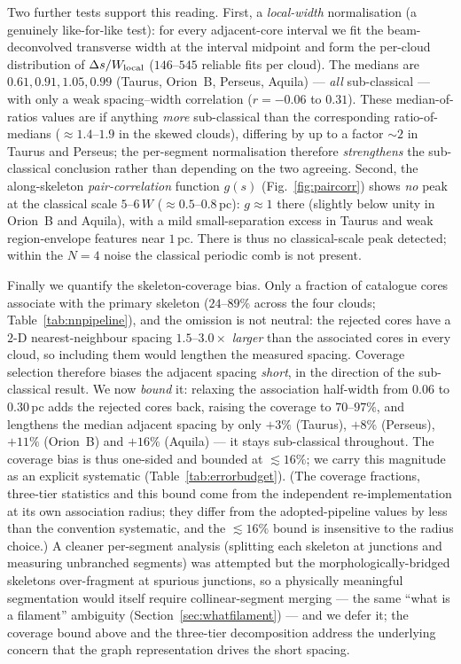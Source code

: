\documentclass[usenatbib,twoside,twocolumn]{mnras}
\begin{document}
Two further tests support this reading. First, a \emph{local-width} normalisation (a genuinely like-for-like test): for every adjacent-core interval we fit the beam-deconvolved transverse width at the interval midpoint and form the per-cloud distribution of $\Delta s/W_{\rm local}$ ($146$--$545$ reliable fits per cloud). The medians are $0.61,0.91,1.05,0.99$ (Taurus, Orion~B, Perseus, Aquila) --- \emph{all} sub-classical --- with only a weak spacing--width correlation ($r=-0.06$ to $0.31$). These median-of-ratios values are if anything \emph{more} sub-classical than the corresponding ratio-of-medians ($\approx1.4$--$1.9$ in the skewed clouds), differing by up to a factor $\sim2$ in Taurus and Perseus; the per-segment normalisation therefore \emph{strengthens} the sub-classical conclusion rather than depending on the two agreeing. Second, the along-skeleton \emph{pair-correlation} function $g(s)$ (Fig.~\ref{fig:paircorr}) shows \emph{no} peak at the classical scale $5$--$6\,W$ ($\approx0.5$--$0.8$\,pc): $g\approx1$ there (slightly below unity in Orion~B and Aquila), with a mild small-separation excess in Taurus and weak region-envelope features near $1$\,pc. There is thus no classical-scale peak detected; within the $N=4$ noise the classical periodic comb is not present.

Finally we quantify the skeleton-coverage bias. Only a fraction of catalogue cores associate with the primary skeleton ($24$--$89\%$ across the four clouds; Table~\ref{tab:nnpipeline}), and the omission is not neutral: the rejected cores have a $2$-D nearest-neighbour spacing $1.5$--$3.0\times$ \emph{larger} than the associated cores in every cloud, so including them would lengthen the measured spacing. Coverage selection therefore biases the adjacent spacing \emph{short}, in the direction of the sub-classical result. We now \emph{bound} it: relaxing the association half-width from $0.06$ to $0.30$\,pc adds the rejected cores back, raising the coverage to $70$--$97\%$, and lengthens the median adjacent spacing by only $+3\%$ (Taurus), $+8\%$ (Perseus), $+11\%$ (Orion~B) and $+16\%$ (Aquila) --- it stays sub-classical throughout. The coverage bias is thus one-sided and bounded at $\lesssim16\%$; we carry this magnitude as an explicit systematic (Table~\ref{tab:errorbudget}). (The coverage fractions, three-tier statistics and this bound come from the independent re-implementation at its own association radius; they differ from the adopted-pipeline values by less than the convention systematic, and the $\lesssim16\%$ bound is insensitive to the radius choice.) A cleaner per-segment analysis (splitting each skeleton at junctions and measuring unbranched segments) was attempted but the morphologically-bridged skeletons over-fragment at spurious junctions, so a physically meaningful segmentation would itself require collinear-segment merging --- the same ``what is a filament'' ambiguity (Section~\ref{sec:whatfilament}) --- and we defer it; the coverage bound above and the three-tier decomposition address the underlying concern that the graph representation drives the short spacing.
\end{document}
